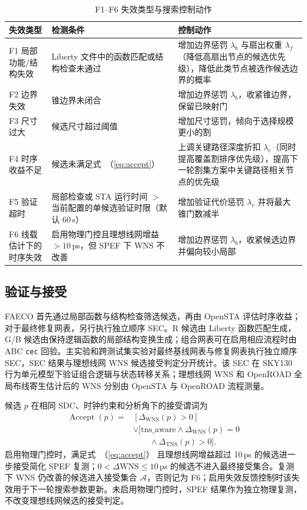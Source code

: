 \documentclass[twocolumn,10pt,fontset=windows]{ctexart}
\renewcommand{\eqref}[1]{\textup{（\ref{#1}）}}
\begin{document}
\begin{table}[!htbp]
\centering
\caption{F1--F6 失效类型与搜索控制动作}
\label{tab:failures}
\scriptsize
\setlength{\tabcolsep}{2pt}
\begin{tabular}{p{2.0cm}p{2.6cm}p{2.9cm}}
\toprule
\textbf{失效类型} & \textbf{检测条件} & \textbf{控制动作} \\
\midrule
F1 局部功能/结构失效 & Liberty 文件中的函数匹配或结构检查未通过 & 增加边界惩罚 $\lambda_b$ 与扇出权重 $\lambda_f$（降低高扇出节点的候选优先级），降低此类节点被选作候选边界的概率 \\
F2 边界失效 & 锥边界未闭合 & 增加边界惩罚 $\lambda_b$，收紧锥边界，保留已映射门 \\
F3 尺寸过大 & 候选尺寸超过阈值 & 增加尺寸惩罚，倾向于选择规模更小的割 \\
F4 时序收益不足 & 候选未满足式~\eqref{eq:accept} & 上调关键路径深度折扣 $\lambda_c$（同时提高覆盖割排序优先级），提高下一轮割集方案中关键路径相关节点的优先级 \\
F5 验证超时 & 局部检查或 STA 运行时间 $>$ 当前配置的单候选验证时限（默认 $60\,$s） & 增加验证代价惩罚 $\lambda_v$ 并将最大锥门数减半 \\
F6 线载估计下的时序失效 & 启用物理门控且理想线网增益 $>10\,$ps，但 SPEF 下 WNS 不改善 & 增加边界惩罚 $\lambda_b$，收紧候选边界并偏向较小局部 \\
\bottomrule
\end{tabular}
\end{table}

\subsection{验证与接受}\label{sec:validation}
FAECO 首先通过局部函数与结构检查筛选候选，再由 OpenSTA 评估时序收益；对于最终修复网表，另行执行独立顺序 SEC。R 候选由 Liberty 函数匹配生成，G/B 候选由保持逻辑函数的局部结构变换生成；组合网表可在启用相应流程时由 ABC \texttt{cec} 回验。主实验和跨测试集实验对最终基线网表与修复网表执行独立顺序 SEC，SEC 结果与理想线网 WNS 候选接受判定分开统计。该 SEC 在 SKY130 行为单元模型下验证组合逻辑与状态转移关系；理想线网 WNS 和 OpenROAD 全局布线寄生估计后的 WNS 分别由 OpenSTA 与 OpenROAD 流程测量。

候选 $p$ 在相同 SDC、时钟约束和分析角下的接受谓词为
\begin{equation}
\label{eq:accept}
\begin{aligned}
\operatorname{Accept}(p)={}&[\Delta_{\mathrm{WNS}}(p)>0]\\
&\lor[\mathrm{tns\_aware}\land\Delta_{\mathrm{WNS}}(p)=0\\
&\qquad\land\Delta_{\mathrm{TNS}}(p)>0].
\end{aligned}
\end{equation}
启用物理门控时，满足式~\eqref{eq:accept} 且理想线网增益超过 10\,ps 的候选进一步接受简化 SPEF 复测；$0<\Delta\mathrm{WNS}\le10\,$ps 的候选不进入最终接受集合。复测下 WNS 仍改善的候选进入接受集合 $\mathcal{A}$，否则记为 F6；启用失效反馈控制时该失效用于下一轮搜索参数更新。未启用物理门控时，SPEF 结果作为独立物理复测，不改变理想线网候选的接受判定。
\end{document}
